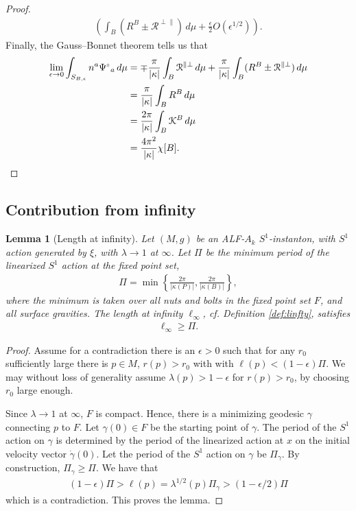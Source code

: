 \documentclass[a4paper,10pt,reqno]{amsart}
\newcommand{\nut}{P}
\newcommand{\bolt}{B}
\newcommand{\cR}{\mathcal{R}}
\theoremstyle{plain}
\newtheorem{lemma}[thm]{Lemma}
\newcommand{\PM}[1]{{{#1}^{\hspace{-.5pt}\scaleto{\pm}{3.5pt}}}}
\numberwithin{equation}{section}
\newcommand{\eps}{\epsilon}
\newcommand{\Fixed}{F}
\begin{document}
\begin{proof}
\begin{align}
\left(
\int_\bolt
( R^\bolt \pm \cR^{\perp\parallel} ) \, d\mu
+ \frac{\epsilon}{2} O(\epsilon^{1/2})
\right).
\end{align}
Finally, the Gauss--Bonnet theorem tells us that
\begin{align}
\lim_{\eps \to 0} 
\int_{S_{\bolt,\epsilon}} n^a \PM\Psi_a \, d\mu
&=
\mp \frac{\pi}{|\kappa|} \int_\bolt \cR^{\parallel\perp} \, d\mu
+ \frac{\pi}{|\kappa|} 
\int_\bolt (R^\bolt \pm \cR^{\parallel\perp}) \, d\mu \\
&= \frac{\pi}{|\kappa|} \int_\bolt R^\bolt \, d\mu \\
&= \frac{2\pi}{|\kappa|} \int_\bolt \mathcal{K}^\bolt \, d\mu \\
&= \frac{4\pi^2}{|\kappa|} \chi[\bolt]. 
\end{align}
\end{proof} 


\subsection{Contribution from infinity} \label{sec:infterm}

\begin{lemma}[Length at infinity] \label{lem:ellinfty} 
Let $(M,g)$ be an ALF-$A_k$ $S^1$-instanton, with $S^1$ action generated by $\xi$, with $\lambda \to 1$ at $\infty$. 
Let  $\Pi$ be the minimum period of the linearized $S^1$ action at the fixed point set, 
\begin{align} 
\Pi = \min \left \{ \frac{2\pi}{|\kappa(\nut)|}, \frac{2\pi}{|\kappa(\bolt)|} \right \},  
\end{align} 
where the minimum is taken over all nuts and bolts in the fixed point set $F$, and all surface gravities. 
The length at infinity $\ell_\infty$, cf. Definition \ref{def:linfty}, satisfies 
\begin{align} \label{eq:ellinfty}
\ell_\infty \geq \Pi. 
%
\end{align} 
\end{lemma} 

\begin{proof} 
%
Assume for a contradiction there is an $\eps > 0$ such that for any $r_0$ sufficiently large there is $p \in M$, $r(p) > r_0$ with with $\ell(p) < (1-\eps)\Pi$. We may without loss of generality assume $\lambda(p) > 1-\eps$ for $r(p) > r_0$, by choosing $r_0$ large enough. 

Since $\lambda \to 1$ at $\infty$, $\Fixed$ is compact. Hence, there is a minimizing geodesic $\gamma$ connecting $p$ to  $\Fixed$. Let $\gamma(0) \in \Fixed$ be the starting point of $\gamma$. The period of the $S^1$ action on $\gamma$ is determined by the period of the linearized action at $x$ on the initial velocity vector $\dot \gamma(0)$. Let the period of the $S^1$ action on $\gamma$ be $\Pi_\gamma$. By construction, $\Pi_\gamma \geq \Pi$. We have that 
\begin{align} 
(1-\eps) \Pi > \ell(p) =\lambda^{1/2}(p) \Pi_\gamma > (1-\eps/2)\Pi
\end{align} 
which is a contradiction. This proves the lemma.
\end{proof} 
\end{document}
